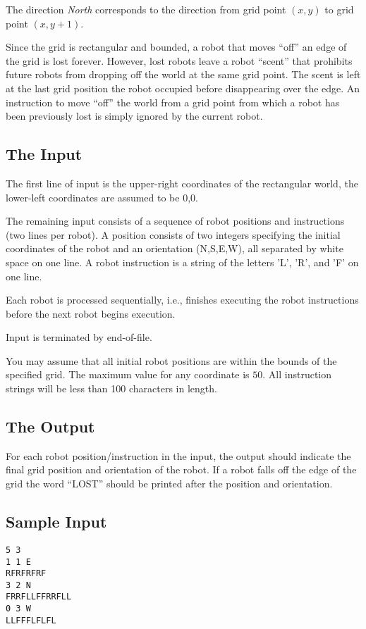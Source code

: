 The direction {\em North} corresponds to the direction from grid point
$(x,y)$ to grid point $(x,y+1)$.

Since the grid is rectangular and bounded, a robot that moves ``off'' an
edge of the grid is lost forever.  However, lost robots leave a robot
``scent'' that prohibits future robots from dropping off the world at
the same grid point.  The scent is left at the last grid position the
robot occupied before disappearing over the edge.  An instruction to
move ``off'' the world from a grid point from which a robot has been
previously lost is simply ignored by the current robot.

\subsection*{The Input}

The first line of input is the upper-right coordinates of the rectangular
world, the lower-left coordinates are assumed to be 0,0.

The remaining input consists of a sequence of robot positions and
instructions (two lines per robot).  A position consists of two integers
specifying the initial coordinates of the robot and an orientation
(N,S,E,W), all separated by white space on one line.  A robot
instruction is a string of the letters 'L', 'R', and 'F' on one line.

Each robot is processed sequentially, i.e., finishes executing the robot
instructions before the next robot begins execution.

Input is terminated by end-of-file.

You may assume that all initial robot positions are within the bounds of
the specified grid.  The maximum value for any coordinate is $50$.  All
instruction strings will be less than 100 characters in length.

\subsection*{The Output}

For each robot position/instruction in the input, the output should
indicate the final grid position and orientation of the robot.  If a
robot falls off the edge of the grid the word ``LOST'' should be printed
after the position and orientation.

\subsection*{Sample Input}
\begin{verbatim}
5 3
1 1 E
RFRFRFRF
3 2 N
FRRFLLFFRRFLL
0 3 W
LLFFFLFLFL
\end{verbatim}


